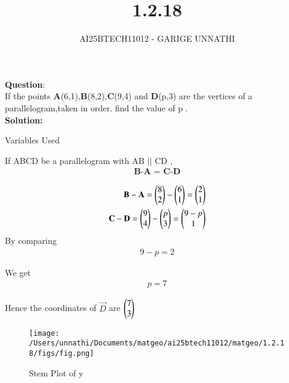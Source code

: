 \documentclass[journal]{IEEEtran}
\begin{document}

\vspace{3cm}

\title{1.2.18}
\author{AI25BTECH11012 - GARIGE UNNATHI}
{\let\newpage\relax\maketitle}


\renewcommand{\thefigure}{\theenumi}
\renewcommand{\thetable}{\theenumi}
\setlength{\intextsep}{10pt} %


\renewcommand{\thetable}{\theenumi}


\textbf{Question}:\\
If the points \textbf{A}(6,1),\textbf{B}(8,2),\textbf{C}(9,4) and \textbf{D}(p,3) are the vertices of a parallelogram,taken in order. find the value of p .
\\
\textbf{Solution: }

 \begin{table}[h!]    
      \centering
      
      \caption{Variables Used}
      \label{}
    \end{table}

 If ABCD be a parallelogram with AB $||$ CD ,
 \begin{align*}
\textbf{B-A $=$ C-D}
\end{align*}


\begin{align}
    \mathbf{B}-\mathbf{A}=\begin{pmatrix}8 \\ 2\end{pmatrix} -\begin{pmatrix}6 \\ 1\end{pmatrix}=\begin{pmatrix}2 \\ 1\end{pmatrix}\\
     \mathbf{C}-\mathbf{D}=\begin{pmatrix}9 \\ 4\end{pmatrix} -\begin{pmatrix}p \\ 3\end{pmatrix}=\begin{pmatrix}9-p \\ 1\end{pmatrix} 
\end{align}
By comparing 
\begin{align}
    9-p = 2
\end{align}

We get 
\begin{align}
    p = 7
\end{align}

Hence the coordinates of $\vec{D}$ are $\begin{pmatrix}7 \\ 3\end{pmatrix}$

\begin{figure}[h!]
   \centering
   \texttt{[image: /Users/unnathi/Documents/matgeo/ai25btech11012/matgeo/1.2.18/figs/fig.png]}
   \caption{Stem Plot of y}
   \label{stemplot}
\end{figure}
\end{document}
